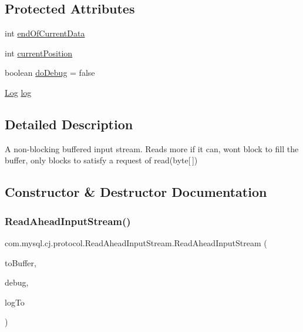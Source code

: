 \subsection*{Protected Attributes}
\begin{DoxyCompactItemize}
\item 
int \mbox{\hyperlink{classcom_1_1mysql_1_1cj_1_1protocol_1_1_read_ahead_input_stream_a610f1fb0f37469d11a19adbb2d2f116e}{end\+Of\+Current\+Data}}
\item 
int \mbox{\hyperlink{classcom_1_1mysql_1_1cj_1_1protocol_1_1_read_ahead_input_stream_a5945549400abb32d2e8dbb686b7af786}{current\+Position}}
\item 
boolean \mbox{\hyperlink{classcom_1_1mysql_1_1cj_1_1protocol_1_1_read_ahead_input_stream_a36c489a54865b32a5477505cc0cfdc88}{do\+Debug}} = false
\item 
\mbox{\hyperlink{interfacecom_1_1mysql_1_1cj_1_1log_1_1_log}{Log}} \mbox{\hyperlink{classcom_1_1mysql_1_1cj_1_1protocol_1_1_read_ahead_input_stream_a244243ffa076d708c4f5ba1686ce5151}{log}}
\end{DoxyCompactItemize}


\subsection{Detailed Description}
A non-\/blocking buffered input stream. Reads more if it can, won\textquotesingle{}t block to fill the buffer, only blocks to satisfy a request of read(byte\mbox{[}$\,$\mbox{]}) 

\subsection{Constructor \& Destructor Documentation}
\mbox{\label{classcom_1_1mysql_1_1cj_1_1protocol_1_1_read_ahead_input_stream_ae5435f386001c88ac355cf664961fcbb}} 
\subsubsection{\texorpdfstring{Read\+Ahead\+Input\+Stream()}{ReadAheadInputStream()}\hspace{0.1cm}{\footnotesize\ttfamily [1/2]}}
{\footnotesize\ttfamily com.\+mysql.\+cj.\+protocol.\+Read\+Ahead\+Input\+Stream.\+Read\+Ahead\+Input\+Stream (\begin{DoxyParamCaption}\item[{Input\+Stream}]{to\+Buffer,  }\item[{boolean}]{debug,  }\item[{\mbox{\hyperlink{interfacecom_1_1mysql_1_1cj_1_1log_1_1_log}{Log}}}]{log\+To }\end{DoxyParamCaption})}

